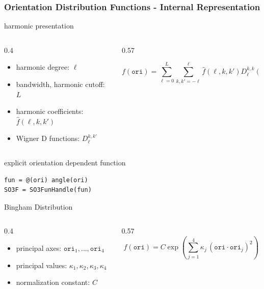 \documentclass[compress,aspectratio=1610,fleqn]{beamer}
\begin{document}
\begin{frame}[fragile]
  \frametitle{Orientation Distribution Functions - Internal Representation}

   harmonic presentation
  \begin{columns}
    \begin{column}{0.4\textwidth}
      \begin{itemize}
      \item harmonic degree: $\ell$
      \item bandwidth, harmonic cutoff: $L$
      \item harmonic coefficients: $\hat f(\ell,k,k')$
      \item Wigner D functions: $D_{\ell}^{k,k'}$
      \end{itemize}
    \end{column}
    \begin{column}{0.57\textwidth}

      \begin{equation*}
        f(\mathtt{ori})
        = \sum_{\ell=0}^{L} \sum_{k,k'=-\ell}^{\ell} \hat f(\ell,k,k') D_{\ell}^{k,k}(\mathtt{ori})
      \end{equation*}
    \end{column}

  \end{columns}

  \pause
  \bigskip

   explicit orientation dependent function
  \begin{lstlisting}[style=input]
fun = @(ori) angle(ori)
SO3F = SO3FunHandle(fun)
  \end{lstlisting}

  \pause
  \bigskip

   Bingham Distribution
  \begin{columns}
    \begin{column}{0.4\textwidth}
      \begin{itemize}
    \item principal axes: $\mathtt{ori}_{1},\ldots,\mathtt{ori}_{4}$
    \item principal values: $\kappa_{1}, \kappa_{2}, \kappa_{3}, \kappa_{4}$
    \item normalization constant: $C$
    \end{itemize}
  \end{column}
    \begin{column}{0.57\textwidth}
      \begin{equation*}
        f(\mathtt{ori}) = C \exp\left(\sum_{j=1}^{4} \kappa_{j} \, (\mathtt{ori} \cdot \mathtt{ori}_{j})^{2}\right)
      \end{equation*}
    \end{column}
    \end{columns}

  \end{frame}
\end{document}
